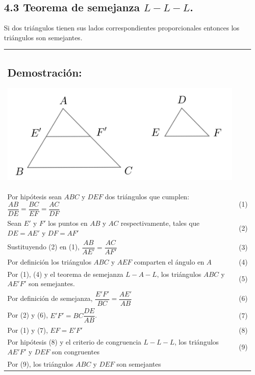 \documentclass[12pt,a4paper]{article}
\begin{document}
\subsection*{4.3 Teorema de semejanza $L-L-L$.}
Si dos triángulos tienen sus lados correspondientes proporcionales entonces los triángulos son semejantes.\\
\begin{tabular}{p{15.9cm}p{1cm}}
\subsection*{Demostración:}
\begin{center}
\includegraphics[scale=0.75]{Imagenes/semejanza.png} 
\end{center} 
\\Por hipótesis sean $ABC$ y $DEF$ dos triángulos que cumplen: $\dfrac{AB}{DE}=\dfrac{BC}{EF}=\dfrac{AC}{DF}$ & (1)
\\Sean $E'$ y $F'$ los puntos en $AB$ y $AC$ respectivamente, tales que $DE = AE'$ y $DF= AF'$ &(2)
\\Sustituyendo (2) en (1), $\dfrac{AB}{AE'}=\dfrac{AC}{AF'}$&(3)
\\ Por definición los triángulos $ABC$ y $AEF$ comparten el ángulo en $A$ &(4)
\\Por (1), (4) y el teorema de semejanza $L-A-L$, los triángulos $ABC$ y $AE'F'$ son semejantes. &(5)
\\Por definición de semejanza, $\dfrac{E'F'}{BC}=\dfrac{AE'}{AB}$ &(6)
\\Por (2) y (6), $E'F'=BC\dfrac{DE}{AB}$. & (7)
\\Por (1) y (7), $EF=E'F'$ & (8)
\\Por hipótesis (8) y el criterio de congruencia $L-L-L$, los triángulos $AE'F'$ y $DEF$ son congruentes &\medskip(9)
\\Por (9), los triángulos $ABC$ y $DEF$ son semejantes
\end{tabular}
\end{document}

